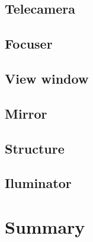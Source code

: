 \subsection{Telecamera}
\subsection{Focuser}
\subsection{View window}
\subsection{Mirror}
\subsection{Structure}
\subsection{Iluminator}

\section{Summary}
